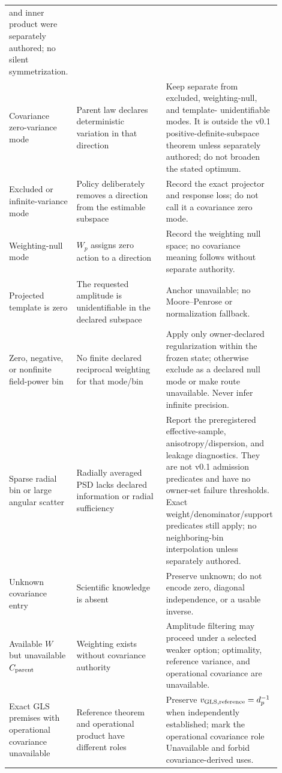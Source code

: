 \begin{longtable}{p{0.22\linewidth}p{0.36\linewidth}p{0.32\linewidth}}
and inner product were separately authored; no silent symmetrization. \\
Covariance zero-variance mode & Parent law declares deterministic variation in
that direction & Keep separate from excluded, weighting-null, and template-
unidentifiable modes. It is outside the v0.1 positive-definite-subspace theorem
unless separately authored; do not broaden the stated optimum. \\
Excluded or infinite-variance mode & Policy deliberately removes a direction
from the estimable subspace & Record the exact projector and response loss; do
not call it a covariance zero mode. \\
Weighting-null mode & $W_p$ assigns zero action to a direction & Record the
weighting null space; no covariance meaning follows without separate authority. \\
Projected template is zero & The requested amplitude is unidentifiable in the
declared subspace & Anchor unavailable; no Moore--Penrose or normalization
fallback. \\
Zero, negative, or nonfinite field-power bin & No finite declared reciprocal weighting
for that mode/bin & Apply only owner-declared regularization within the frozen
state; otherwise exclude as a declared null mode or make route unavailable.
Never infer infinite precision. \\
Sparse radial bin or large angular scatter & Radially averaged PSD lacks
declared information or radial sufficiency & Report the preregistered
effective-sample, anisotropy/dispersion, and leakage diagnostics. They are not
v0.1 admission predicates and have no owner-set failure thresholds. Exact
weight/denominator/support predicates still apply; no neighboring-bin
interpolation unless separately authored. \\
Unknown covariance entry & Scientific knowledge is absent & Preserve unknown;
do not encode zero, diagonal independence, or a usable inverse. \\
Available $W$ but unavailable $C_{\rm parent}$ & Weighting exists without
covariance authority & Amplitude filtering may proceed under a selected weaker
option; optimality, reference variance, and operational covariance are unavailable. \\
Exact GLS premises with operational covariance unavailable & Reference theorem
and operational product have different roles & Preserve
$v_{{\rm GLS,reference}}=d_p^{-1}$ when independently established; mark the
operational covariance role Unavailable{} and forbid covariance-derived uses. \\

\end{longtable}
